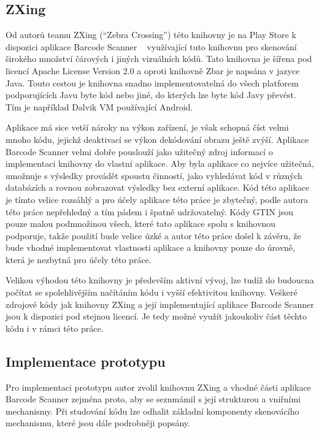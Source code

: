 \documentclass[thesis=B,czech]{FITthesis}[2013/10/20]
\begin{document}
\subsection{ZXing ~\cite{zxing}}

Od autorů teamu ZXing (``Zebra Crossing'') této knihovny je na Play Store k dispozici aplikace Barcode Scanner ~\cite{barcode_scanner} využívající tuto knihovnu pro skenování širokého množství čárových i jiných vizuálních kódů. Tato knihovna je šířena pod licencí Apache License Version 2.0 a oproti knihovně Zbar je napsána v jazyce Java. Touto cestou je knihovna snadno implementovatelná do všech platforem podporujících Javu byte kód nebo jiné, do kterých lze byte kód Javy převést. Tím je například Dalvik VM používající Android.

Aplikace má sice vetší nároky na výkon zařízení, je však schopná číst velmi mnoho kódu, jejichž deaktivací se výkon dekódování obrazu ještě zvýší. Aplikace Barcode Scanner velmi dobře pouslouží jako užitečný zdroj informací o implementaci knihovny do vlastní aplikace. Aby byla aplikace co nejvíce užitečná, umožnuje s výsledky provádět spoustu činností, jako vyhledávat kód v různých databázích a rovnou zobrazovat výsledky bez externí aplikace. Kód této aplikace je tímto velice rozsáhlý a pro účely aplikace této práce je zbytečný, podle autora této práce nepřehledný a tím pádem i špatně udržovatelný. Kódy GTIN jsou pouze malou podmnožinou všech, které tato aplikace spolu s knihovnou podporuje, takže použití bude velice úzké a autor této práce došel k závěru, že bude vhodné implementovat vlastnosti aplikace a knihovny pouze do úrovně, která je nezbytná pro účely této práce.

Velikou výhodou této knihovny je především aktivní vývoj, lze tudíž do budoucna počítat se spolehlivějším načítáním kódu i vyšší efektivitou knihovny. Veškeré zdrojové kódy jak knihovny ZXing a její implementující aplikace Barcode Scanner jsou k dispozici pod stejnou licencí. Je tedy možné využít jakoukoliv část těchto kódu i v rámci této práce. 

\subsection{Implementace prototypu}

Pro implementaci prototypu autor zvolil knihovnu ZXing a vhodné části aplikace Barcode Scanner zejména proto, aby se seznmámil s její strukturou a vniřními mechanismy. Při studování kódu lze odhalit základní komponenty skenovácího mechanismu, které jsou dále podrobněji popsány.
\end{document}
